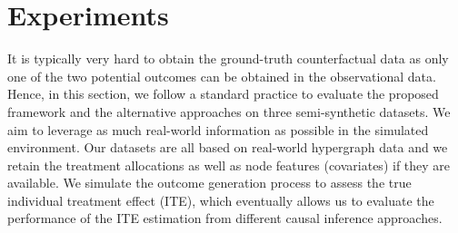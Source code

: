 
\section{Experiments}
It is typically very hard to obtain the ground-truth counterfactual data as only one of the two potential outcomes can be obtained in the observational data. Hence, in this section, we follow a standard practice to evaluate the proposed framework and the alternative approaches on three semi-synthetic datasets. We aim to leverage as much real-world information as possible in the simulated environment. Our datasets are all based on real-world hypergraph data and we retain the treatment allocations as well as node features (covariates) if they are available. We simulate the outcome generation process to assess the true individual treatment effect (ITE), which eventually allows us to evaluate the performance of the ITE estimation from different causal inference approaches. 

